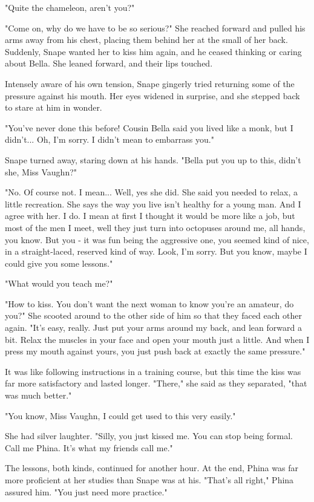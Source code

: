 \documentclass[a4paper,11pt]{article}
\begin{document}
"Quite the chameleon, aren't you?"

"Come on, why do we have to be so serious?" She reached forward and pulled his arms away from his chest, placing them behind her at the small of her back. Suddenly, Snape wanted her to kiss him again, and he ceased thinking or caring about Bella. She leaned forward, and their lips touched.

Intensely aware of his own tension, Snape gingerly tried returning some of the pressure against his mouth. Her eyes widened in surprise, and she stepped back to stare at him in wonder.

"You've never done this before! Cousin Bella said you lived like a monk, but I didn't... Oh, I'm sorry. I didn't mean to embarrass you."

Snape turned away, staring down at his hands. "Bella put you up to this, didn't she, Miss Vaughn?"

"No. Of course not. I mean... Well, yes she did. She said you needed to relax, a little recreation. She says the way you live isn't healthy for a young man. And I agree with her. I do. I mean at first I thought it would be more like a job, but most of the men I meet, well they just turn into octopuses around me, all hands, you know. But you - it was fun being the aggressive one, you seemed kind of nice, in a straight-laced, reserved kind of way. Look, I'm sorry. But you know, maybe I could give you some lessons."

"What would you teach me?"

"How to kiss. You don't want the next woman to know you're an amateur, do you?" She scooted around to the other side of him so that they faced each other again. "It's easy, really. Just put your arms around my back, and lean forward a bit. Relax the muscles in your face and open your mouth just a little. And when I press my mouth against yours, you just push back at exactly the same pressure."

It was like following instructions in a training course, but this time the kiss was far more satisfactory and lasted longer. "There," she said as they separated, "that was much better."

"You know, Miss Vaughn, I could get used to this very easily."

She had silver laughter. "Silly, you just kissed me. You can stop being formal. Call me Phina. It's what my friends call me."

The lessons, both kinds, continued for another hour. At the end, Phina was far more proficient at her studies than Snape was at his. "That's all right," Phina assured him. "You just need more practice."
\end{document}
